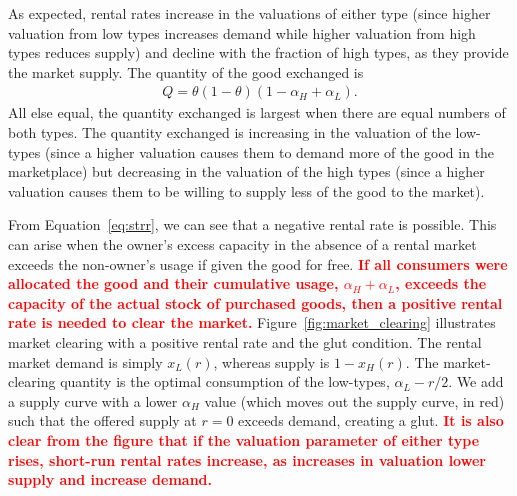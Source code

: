\documentclass[11pt]{article}
\newcommand{\important}[1]{\textcolor{red}{\textbf{#1}}}
\newcommand{\important}[1]{#1}
\begin{document}
As expected, rental rates increase in the valuations of either type (since higher valuation from low types increases demand while higher valuation from high types reduces supply) and decline with the fraction of high types, as they provide the market supply. 
The quantity of the good exchanged is 
\begin{align}
  Q = \theta (1-\theta) \left(1 - \alpha_H + \alpha_L\right).
\end{align} 
All else equal, the quantity exchanged is largest when there are equal numbers of both types.
The quantity exchanged is increasing in the valuation of the low-types (since a higher valuation causes them to demand more of the good in the marketplace) but decreasing in the valuation of the high types (since a higher valuation causes them to be willing to supply less of the good to the market). 

From Equation~\ref{eq:strr}, we can see that a negative rental rate is possible. 
This can arise when the owner's excess capacity in the absence of a rental market exceeds the non-owner's usage if given the good for free.
\important{If all consumers were allocated the good and their cumulative usage, $\alpha_H + \alpha_L$, exceeds the capacity of the actual stock of purchased goods, then a positive rental rate is needed to clear the market.}
Figure~\ref{fig:market_clearing} illustrates market clearing with a positive rental rate and the glut condition. 
The rental market demand is simply $x_L(r)$, whereas supply is $1-x_H(r)$. 
The market-clearing quantity is the optimal consumption of the low-types, $\alpha_L - r/2$. 
We add a supply curve with a lower $\alpha_H$ value (which moves out the supply curve, in red) such that the offered supply at $r = 0$ exceeds demand, creating a glut.  
\important{It is also clear from the figure that if the valuation parameter of either type rises, short-run rental rates increase, as increases in valuation lower supply and increase demand.} 
 
\end{document}
